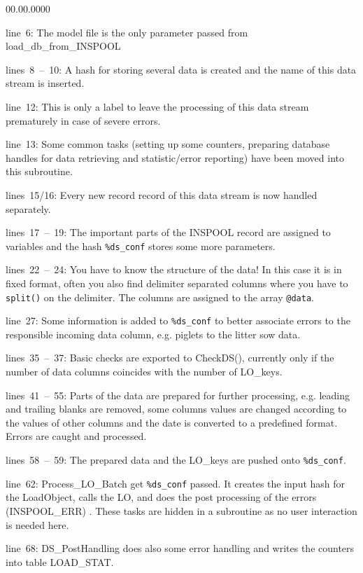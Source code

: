 \begin{lyxlist}{00.00.0000}
\item [line~6:]The model file is the only parameter passed from load\_db\_from\_INSPOOL
\item [lines~8~--~10:]A hash for storing several data is created and
the name of this data stream is inserted.
\item [line~12:]This is only a label to leave the processing of this data
stream prematurely in case of severe errors.
\item [line~13:]Some common tasks (setting up some counters, preparing
database handles for data retrieving and statistic/error reporting)
have been moved into this subroutine.
\item [lines~15/16:]Every new record record of this data stream is now
handled separately.
\item [lines~17~--~19:]The important parts of the INSPOOL record are
assigned to variables and the hash \texttt{\small \%ds\_conf} stores
some more parameters.
\item [lines~22~--~24:]You have to know the structure of the data! In
this case it is in fixed format, often you also find delimiter separated
columns where you have to \texttt{\scriptsize split()} on the delimiter.
The columns are assigned to the array \texttt{\small @data}.
\item [line~27:]Some information is added to \texttt{\scriptsize \%ds\_conf}
to better associate errors to the responsible incoming data column,
e.g. piglets to the litter sow data.
\item [lines~35~--~37:]Basic checks are exported to CheckDS(), currently
only if the number of data columns coincides with the number of LO\_keys.
\item [lines~41~--~55:]Parts of the data are prepared for further processing,
e.g. leading and trailing blanks are removed, some columns values
are changed according to the values of other columns and the date
is converted to a predefined format. Errors are caught and processed.
\item [lines~58~--~59:]The prepared data and the LO\_keys are pushed
onto \texttt{\small \%ds\_conf}.
\item [line~62:]Process\_LO\_Batch get \texttt{\small \%ds\_conf} passed.
It creates the input hash for the LoadObject, calls the LO, and does
the post processing of the errors (INSPOOL\_ERR) . These tasks are
hidden in a subroutine as no user interaction is needed here.
\item [line~68:]DS\_PostHandling does also some error handling and writes
the counters into table LOAD\_STAT.
\end{lyxlist}

